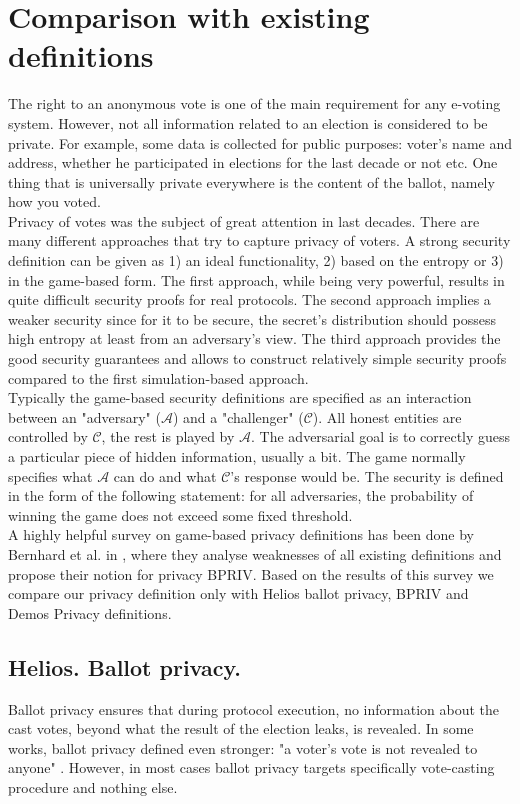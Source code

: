  \section{Comparison with existing definitions}
 \label{comparison} 
The right to an anonymous vote is one of the main requirement for any e-voting system. However, not all information related to an election is considered to be private. For example, some data is collected for public purposes: voter's name and address, whether he participated in elections for the last decade or not etc.  One thing that is universally private everywhere is the content of the ballot, namely how you voted.\\

 Privacy of votes was the subject of great attention in last decades. There are many different approaches that try to capture privacy of voters. A strong security definition can be given  as 1) an ideal functionality, 2) based on the entropy or 3) in the game-based form. The first approach, while being very powerful, results in quite difficult security proofs for real protocols. The second approach implies a weaker security since for it to be secure, the secret's distribution should possess high entropy at least from an adversary's view. The third approach provides the good security guarantees and allows to construct relatively simple security proofs compared to the first simulation-based approach.\\
 
Typically the game-based security definitions are specified as an interaction between  an "adversary" ($\mathcal{A}$) and a "challenger" ($\mathcal{C}$). All honest entities are controlled by $\mathcal{C}$, the rest is played by $\mathcal{A}$. The adversarial goal is to correctly guess a particular piece of hidden information, usually a bit. The game normally specifies what $\mathcal{A}$ can do and what $\mathcal{C}$'s response would be.  The security is defined in the form of the following statement: for all adversaries, the probability of winning the game does not exceed some fixed threshold.\\

A highly helpful survey on game-based privacy definitions has been done by Bernhard et al. in \cite{Bernhard2015}, where they analyse weaknesses of all existing definitions and propose their notion for privacy BPRIV. Based on the results of this survey we compare our privacy definition only with Helios ballot privacy, BPRIV and Demos Privacy definitions. 
 \subsection{Helios. Ballot privacy.}
Ballot privacy ensures that during protocol execution, no information about the cast votes, beyond what the result of the election leaks, is revealed. In some works, ballot privacy defined even stronger: "a voter's vote is not revealed to anyone" \cite{Bernhard2011}. However, in most cases ballot privacy targets specifically vote-casting procedure  and nothing else.\\ 
  
